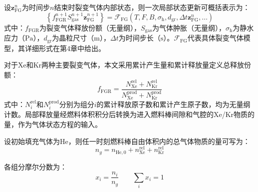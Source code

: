 
设$\mathbf z_{\mathrm{FG}}^n$为时间步$n$结束时裂变气体内部状态，则一次局部状态更新可概括表示为：
\begin{equation}
	\left\{
	f_{\mathrm{FGR}}^{n+1}
	S_{\mathrm{gas}}^{n+1}
	\mathbf z_{\mathrm{FG}}^{n+1}
	\right\}
	=
	\mathcal F_{\mathrm{FG}}
	\left(
	T,F,B,\sigma_{\mathrm h},d_{\mathrm{gr}},\Delta t
	\mathbf z_{\mathrm{FG}}^n,\ldots
	\right)
	\label{eq:ch2_fgr_closure}
\end{equation}
\noindent 式中：$f_{\mathrm{FGR}}$为裂变气体释放份额（无量纲），$S_{\mathrm{gas}}$为气体肿胀（无量纲），$\sigma_{\mathrm h}$为静水应力（$\mathrm{Pa}$），$d_{\mathrm{gr}}$为晶粒尺寸（$\mathrm{m}$），$\Delta t$为时间步长（$\mathrm{s}$）。$\mathcal F_{\mathrm{FG}}$代表具体裂变气体模型，其详细形式在第4章中给出。

对于Xe和Kr两种主要裂变气体，本文采用累计产生量和累计释放量定义总释放份额：
\begin{equation}
	f_{\mathrm{FGR}}
	=
	\frac{
	N_{\mathrm{Xe}}^{\mathrm{rel}}
	+N_{\mathrm{Kr}}^{\mathrm{rel}}
	}{
	N_{\mathrm{Xe}}^{\mathrm{prod}}
	+N_{\mathrm{Kr}}^{\mathrm{prod}}
	}
	\label{eq:ch2_fgr_definition}
\end{equation}
\noindent 式中：$N_i^{\mathrm{rel}}$和$N_i^{\mathrm{prod}}$分别为组分$i$的累计释放原子数和累计产生原子数，均为无量纲计数。局部释放量经燃料体积积分后转换为进入燃料棒间隙和气腔的Xe/Kr物质的量，作为气体状态方程的输入。


设初始填充气体为He，则任一时刻燃料棒自由体积内的总气体物质的量可写为：
\begin{equation}
	n_g
	=n_{\mathrm{He},0}
	+n_{\mathrm{Xe}}^{\mathrm{rel}}
	+n_{\mathrm{Kr}}^{\mathrm{rel}}
	\label{eq:ch2_total_gas_moles}
\end{equation}

各组分摩尔分数为：
\begin{equation}
	x_i=\frac{n_i}{n_g}
	\qquad
	\sum_i x_i=1
	\label{eq:ch2_gas_fraction}
\end{equation}


